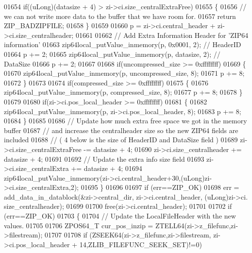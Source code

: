\begin{DoxyCode}
01654       \textcolor{keywordflow}{if}((uLong)(datasize + 4) > zi->ci.size\_centralExtraFree)
01655       \{
01656         \textcolor{comment}{// we can not write more data to the buffer that we have room for.}
01657         \textcolor{keywordflow}{return} ZIP\_BADZIPFILE;
01658       \}
01659 
01660       p = zi->ci.central\_header + zi->ci.size\_centralheader;
01661 
01662       \textcolor{comment}{// Add Extra Information Header for 'ZIP64 information'}
01663       zip64local\_putValue\_inmemory(p, 0x0001, 2); \textcolor{comment}{// HeaderID}
01664       p += 2;
01665       zip64local\_putValue\_inmemory(p, datasize, 2); \textcolor{comment}{// DataSize}
01666       p += 2;
01667 
01668       \textcolor{keywordflow}{if}(uncompressed\_size >= 0xffffffff)
01669       \{
01670         zip64local\_putValue\_inmemory(p, uncompressed\_size, 8);
01671         p += 8;
01672       \}
01673 
01674       \textcolor{keywordflow}{if}(compressed\_size >= 0xffffffff)
01675       \{
01676         zip64local\_putValue\_inmemory(p, compressed\_size, 8);
01677         p += 8;
01678       \}
01679 
01680       \textcolor{keywordflow}{if}(zi->ci.pos\_local\_header >= 0xffffffff)
01681       \{
01682         zip64local\_putValue\_inmemory(p, zi->ci.pos\_local\_header, 8);
01683         p += 8;
01684       \}
01685 
01686       \textcolor{comment}{// Update how much extra free space we got in the memory buffer}
01687       \textcolor{comment}{// and increase the centralheader size so the new ZIP64 fields are included}
01688       \textcolor{comment}{// ( 4 below is the size of HeaderID and DataSize field )}
01689       zi->ci.size\_centralExtraFree -= datasize + 4;
01690       zi->ci.size\_centralheader += datasize + 4;
01691 
01692       \textcolor{comment}{// Update the extra info size field}
01693       zi->ci.size\_centralExtra += datasize + 4;
01694       zip64local\_putValue\_inmemory(zi->ci.central\_header+30,(uLong)zi->ci.size\_centralExtra,2);
01695     \}
01696 
01697     \textcolor{keywordflow}{if} (err==ZIP\_OK)
01698         err = add\_data\_in\_datablock(&zi->central\_dir, zi->ci.central\_header, (uLong)zi->ci.
      size\_centralheader);
01699 
01700     free(zi->ci.central\_header);
01701 
01702     \textcolor{keywordflow}{if} (err==ZIP\_OK)
01703     \{
01704         \textcolor{comment}{// Update the LocalFileHeader with the new values.}
01705 
01706         ZPOS64\_T cur\_pos\_inzip = ZTELL64(zi->z\_filefunc,zi->filestream);
01707 
01708         \textcolor{keywordflow}{if} (ZSEEK64(zi->z\_filefunc,zi->filestream, zi->ci.pos\_local\_header + 14,ZLIB\_FILEFUNC\_SEEK\_SET)!=0)

\end{DoxyCode}

